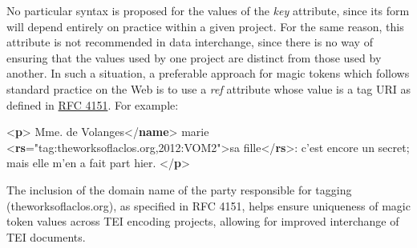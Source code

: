 No particular syntax is proposed for the values of the {\itshape key} attribute, since its form will depend entirely on practice within a given project. For the same reason, this attribute is not recommended in data interchange, since there is no way of ensuring that the values used by one project are distinct from those used by another. In such a situation, a preferable approach for magic tokens which follows standard practice on the Web is to use a {\itshape ref} attribute whose value is a tag URI as defined in \hyperref[RFC4151]{RFC 4151}. For example: \par\bgroup{}\exampleFont \begin{shaded}\noindent\mbox{}{<\textbf{p}>}\mbox{}\newline 
{}Mme. de Volanges{</\textbf{name}>} marie {<\textbf{rs}\hspace*{1em}{ref}="{tag:theworksoflaclos.org,2012:VOM2}">}sa fille{</\textbf{rs}>}: c'est encore un secret;\mbox{}\newline 
 mais elle m'en a fait part hier.\mbox{}\newline 
{</\textbf{p}>}\end{shaded}\egroup\par \noindent  The inclusion of the domain name of the party responsible for tagging (\textsf{theworksoflaclos.org}), as specified in RFC 4151, helps ensure uniqueness of magic token values across TEI encoding projects, allowing for improved interchange of TEI documents.\par
